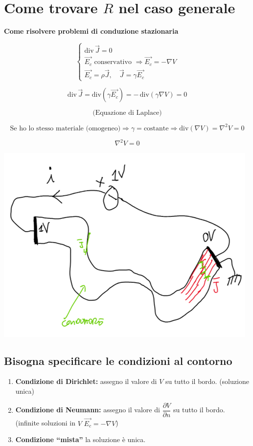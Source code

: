 \section{Come trovare $R$ nel caso generale}

\textbf{Come risolvere problemi di conduzione stazionaria}

\[
\begin{cases}
\mathrm{div}\,\vec{J} = 0 \\
\vec{E_c} \text{ conservativo } \Rightarrow \vec{E_c} = -\nabla V \\
\vec{E_c} = \rho \vec{J}, \quad \vec{J} = \gamma \vec{E_c}
\end{cases}
\]

\[
\mathrm{div}\,\vec{J} = \mathrm{div}(\gamma \vec{E_c}) 
   = -\,\mathrm{div}(\gamma \nabla V) = 0
\]

\[
\text{(Equazione di Laplace)}
\]

\[
\text{Se ho lo stesso materiale (omogeneo)} 
   \Rightarrow \gamma = \text{costante} 
   \Rightarrow \mathrm{div}(\nabla V) = \nabla^2 V = 0
\]

\[
\boxed{\nabla^2 V = 0}
\]
\begin{center}
    \includegraphics[scale = 0.5]{immagini/image16.png}
\end{center}
\subsection*{Bisogna specificare le condizioni al contorno}

\begin{enumerate}
    \item \textbf{Condizione di Dirichlet:} assegno il valore di $V$ su tutto il bordo.  
    \hfill (soluzione unica)
    
    \item \textbf{Condizione di Neumann:} assegno il valore di $\dfrac{\partial V}{\partial n}$ su tutto il bordo.  
    \hfill (infinite soluzioni in $V$ $\vec{E_c} = -\nabla V$)

    \item \textbf{Condizione “mista”} la soluzione è unica.
\end{enumerate}

